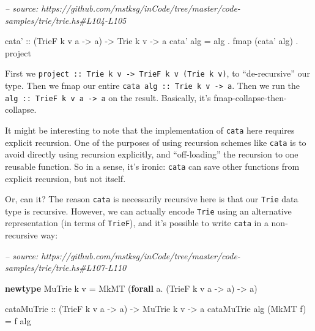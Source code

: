 \documentclass[]{article}
\newenvironment{Shaded}{}{}
\newcommand{\CommentTok}[1]{\textcolor[rgb]{0.38,0.63,0.69}{\textit{#1}}}
\newcommand{\DataTypeTok}[1]{\textcolor[rgb]{0.56,0.13,0.00}{#1}}
\newcommand{\FunctionTok}[1]{\textcolor[rgb]{0.02,0.16,0.49}{#1}}
\newcommand{\KeywordTok}[1]{\textcolor[rgb]{0.00,0.44,0.13}{\textbf{#1}}}
\newcommand{\NormalTok}[1]{#1}
\newcommand{\OtherTok}[1]{\textcolor[rgb]{0.00,0.44,0.13}{#1}}
\begin{document}
\begin{Shaded}
\begin{Highlighting}[]
\CommentTok{-- source: https://github.com/mstksg/inCode/tree/master/code-samples/trie/trie.hs#L104-L105}

\OtherTok{cata' ::}\NormalTok{ (}\DataTypeTok{TrieF}\NormalTok{ k v a }\OtherTok{->}\NormalTok{ a) }\OtherTok{->} \DataTypeTok{Trie}\NormalTok{ k v }\OtherTok{->}\NormalTok{ a}
\NormalTok{cata' alg }\FunctionTok{=}\NormalTok{ alg }\FunctionTok{.} \FunctionTok{fmap}\NormalTok{ (cata' alg) }\FunctionTok{.}\NormalTok{ project}
\end{Highlighting}
\end{Shaded}

First we
\texttt{project\ ::\ Trie\ k\ v\ -\textgreater{}\ TrieF\ k\ v\ (Trie\ k\ v)}, to
``de-recursive'' our type. Then we fmap our entire
\texttt{cata\ alg\ ::\ Trie\ k\ v\ -\textgreater{}\ a}. Then we run the
\texttt{alg\ ::\ TrieF\ k\ v\ a\ -\textgreater{}\ a} on the result. Basically,
it's fmap-collapse-then-collapse.

It might be interesting to note that the implementation of
\texttt{cata\textquotesingle{}} here requires explicit recursion. One of the
purposes of using recursion schemes like \texttt{cata} is to avoid directly
using recursion explicitly, and ``off-loading'' the recursion to one reusable
function. So in a sense, it's ironic: \texttt{cata} can save other functions
from explicit recursion, but not itself.

Or, can it? The reason \texttt{cata\textquotesingle{}} is necessarily recursive
here is that our \texttt{Trie} data type is recursive. However, we can actually
encode \texttt{Trie} using an alternative representation (in terms of
\texttt{TrieF}), and it's possible to write \texttt{cata\textquotesingle{}} in a
non-recursive way:

\begin{Shaded}
\begin{Highlighting}[]
\CommentTok{-- source: https://github.com/mstksg/inCode/tree/master/code-samples/trie/trie.hs#L107-L110}

\KeywordTok{newtype} \DataTypeTok{MuTrie}\NormalTok{ k v }\FunctionTok{=} \DataTypeTok{MkMT}\NormalTok{ (}\KeywordTok{forall}\NormalTok{ a}\FunctionTok{.}\NormalTok{ (}\DataTypeTok{TrieF}\NormalTok{ k v a }\OtherTok{->}\NormalTok{ a) }\OtherTok{->}\NormalTok{ a)}

\OtherTok{cataMuTrie ::}\NormalTok{ (}\DataTypeTok{TrieF}\NormalTok{ k v a }\OtherTok{->}\NormalTok{ a) }\OtherTok{->} \DataTypeTok{MuTrie}\NormalTok{ k v }\OtherTok{->}\NormalTok{ a}
\NormalTok{cataMuTrie alg (}\DataTypeTok{MkMT}\NormalTok{ f) }\FunctionTok{=}\NormalTok{ f alg}
\end{Highlighting}
\end{Shaded}
\end{document}
